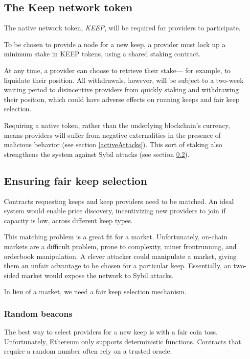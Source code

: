 \documentclass[11pt]{article}
\begin{document}
\subsection{The Keep network token}

The native network token, \textit{KEEP}, will be required for
providers to participate.

To be chosen to provide a node for a new keep, a provider must lock up
a minimum stake in KEEP tokens, using a shared staking contract.

At any time, a provider can choose to retrieve their stake--- for
example, to liquidate their position. All withdrawals, however, will
be subject to a two-week waiting period to disincentive providers from
quickly staking and withdrawing their position, which could have
adverse effects on running keeps and fair keep selection.

Requiring a native token, rather than the underlying blockchain's
currency, means providers will suffer from negative externalities in
the presence of malicious behavior (see section \ref{activeAttacks}). This sort
of staking also strengthens the system against Sybil attacks (see section
\ref{fairKeepSelection}).

\subsection{Ensuring fair keep selection}
\label{fairKeepSelection}

Contracts requesting keeps and keep providers need to be matched. An
ideal system would enable price discovery, incentivizing new providers
to join if capacity is low, across different keep types.

This matching problem is a great fit for a market. Unfortunately,
on-chain markets are a difficult problem, prone to complexity, miner
frontrunning, and orderbook manipulation. A clever attacker could
manipulate a market, giving them an unfair advantage to be chosen for
a particular keep. Essentially, an two-sided market would expose the
network to Sybil attacks.

In lieu of a market, we need a fair keep selection mechanism.

\subsubsection{Random beacons}

The best way to select providers for a new keep is with a fair coin
toss. Unfortunately, Ethereum only supports deterministic functions.
Contracts that require a random number often rely on a trusted oracle.
\end{document}
